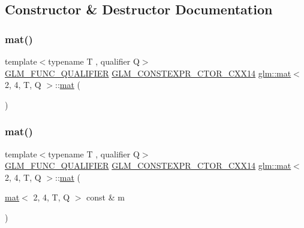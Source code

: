 \subsection{Constructor \& Destructor Documentation}
\mbox{\label{structglm_1_1mat_3_012_00_014_00_01_t_00_01_q_01_4_a7fc67ba4ee21331632e9da37cec2a96e}} 
\subsubsection{\texorpdfstring{mat()}{mat()}\hspace{0.1cm}{\footnotesize\ttfamily [1/21]}}
{\footnotesize\ttfamily template$<$typename T , qualifier Q$>$ \\
\mbox{\hyperlink{setup_8hpp_a33fdea6f91c5f834105f7415e2a64407}{G\+L\+M\+\_\+\+F\+U\+N\+C\+\_\+\+Q\+U\+A\+L\+I\+F\+I\+ER}} \mbox{\hyperlink{setup_8hpp_a0900f9145e68bf6061b6f5e7be3fa751}{G\+L\+M\+\_\+\+C\+O\+N\+S\+T\+E\+X\+P\+R\+\_\+\+C\+T\+O\+R\+\_\+\+C\+X\+X14}} \mbox{\hyperlink{structglm_1_1mat}{glm\+::mat}}$<$ 2, 4, T, Q $>$\+::\mbox{\hyperlink{structglm_1_1mat}{mat}} (\begin{DoxyParamCaption}{ }\end{DoxyParamCaption})}

\mbox{\label{structglm_1_1mat_3_012_00_014_00_01_t_00_01_q_01_4_a78af7c89ef6af64cc6c24b6764a3099c}} 
\subsubsection{\texorpdfstring{mat()}{mat()}\hspace{0.1cm}{\footnotesize\ttfamily [2/21]}}
{\footnotesize\ttfamily template$<$typename T , qualifier Q$>$ \\
\mbox{\hyperlink{setup_8hpp_a33fdea6f91c5f834105f7415e2a64407}{G\+L\+M\+\_\+\+F\+U\+N\+C\+\_\+\+Q\+U\+A\+L\+I\+F\+I\+ER}} \mbox{\hyperlink{setup_8hpp_a0900f9145e68bf6061b6f5e7be3fa751}{G\+L\+M\+\_\+\+C\+O\+N\+S\+T\+E\+X\+P\+R\+\_\+\+C\+T\+O\+R\+\_\+\+C\+X\+X14}} \mbox{\hyperlink{structglm_1_1mat}{glm\+::mat}}$<$ 2, 4, T, Q $>$\+::\mbox{\hyperlink{structglm_1_1mat}{mat}} (\begin{DoxyParamCaption}\item[{\mbox{\hyperlink{structglm_1_1mat}{mat}}$<$ 2, 4, T, Q $>$ const \&}]{m }\end{DoxyParamCaption})}

